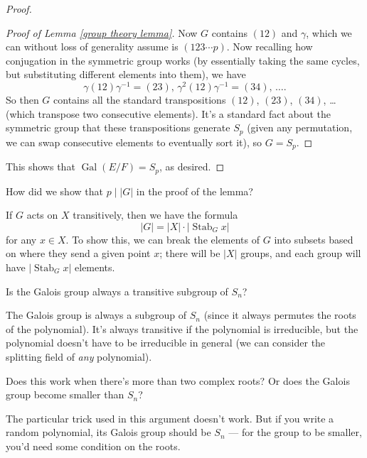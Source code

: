 \begin{proof}
\begin{proof}[Proof of Lemma \ref{group theory lemma}]
        Now $G$ contains $(12)$ and $\gamma$, which we can without loss of generality assume is $(123\cdots p)$. Now recalling how conjugation in the symmetric group works (by essentially taking the same cycles, but substituting different elements into them), we have \[\gamma (12) \gamma^{-1} = (23), \, \gamma^2(12)\gamma^{-1} = (34), \, \ldots.\] So then $G$ contains all the standard transpositions $(12)$, $(23)$, $(34)$, \ldots (which transpose two consecutive elements). It's a standard fact about the symmetric group that these transpositions generate $S_p$ (given any permutation, we can swap consecutive elements to eventually sort it), so $G = S_p$.
    \end{proof}

    This shows that $\operatorname{Gal}(E/F) = S_p$, as desired. 
\end{proof}

\begin{question}
How did we show that $p \mid \lvert G\rvert$ in the proof of the lemma?
\end{question}

\begin{ans}
If $G$ acts on $X$ transitively, then we have the formula \[\lvert G \rvert = \lvert X\rvert \cdot \lvert \operatorname{Stab}_G x\rvert\] for any $x \in X$. To show this, we can break the elements of $G$ into subsets based on where they send a given point $x$; there will be $\lvert X\rvert$ groups, and each group will have $\lvert \operatorname{Stab}_G x\rvert$ elements. 
\end{ans}

\begin{question}
    Is the Galois group always a transitive subgroup of $S_n$?
\end{question}

\begin{ans}
    The Galois group is always a subgroup of $S_n$ (since it always permutes the roots of the polynomial). It's always transitive if the polynomial is irreducible, but the polynomial doesn't have to be irreducible in general (we can consider the splitting field of \emph{any} polynomial). 
\end{ans}

\begin{question}
Does this work when there's more than two complex roots? Or does the Galois group become smaller than $S_n$?
\end{question}

\begin{ans}
The particular trick used in this argument doesn't work. But if you write a random polynomial, its Galois group should be $S_n$ --- for the group to be smaller, you'd need some condition on the roots. 
\end{ans}

